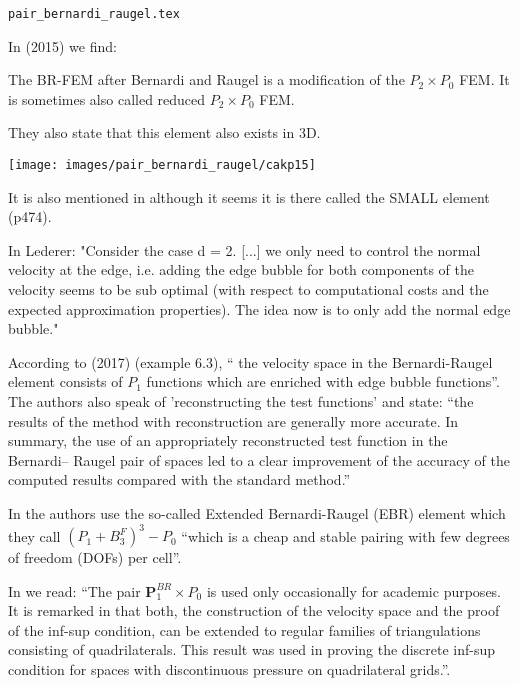 \begin{flushright} {\tiny {\color{gray} \tt pair\_bernardi\_raugel.tex}} \end{flushright}

In \textcite{cakp15} (2015) we find: 
\begin{displayquote}
{\color{darkgray}
The BR-FEM after Bernardi and Raugel \cite{bera85} 
is a modification of the $P_2\times P_0$ FEM. 
It is sometimes also called reduced $P_2\times P_0$ FEM.}
\end{displayquote}
They also state that this element also exists in 3D.

\begin{center}
\texttt{[image: images/pair\_bernardi\_raugel/cakp15]}
\end{center}

It is also mentioned in \textcite{bobf13} although it seems it is there called the SMALL element (p474).

In Lederer: "Consider the case d = 2. [...] we only need to control 
the normal velocity at the edge, i.e. adding the
edge bubble for both components of the velocity seems to be sub optimal (with respect to
computational costs and the expected approximation properties). The idea now is to only
add the normal edge bubble."

According to \textcite{jolm17} (2017) (example 6.3), `` the velocity space in the Bernardi-Raugel
element consists of $P_1$ functions which are enriched with edge bubble functions''.
The authors also speak of 'reconstructing the test functions' and state: 
``the results of the method with reconstruction are generally more accurate.
In summary, the use of an appropriately reconstructed test function in the Bernardi–
Raugel pair of spaces led to a clear improvement of the accuracy of the computed
results compared with the standard method.''

In \cite{befh21} the authors use the so-called Extended Bernardi-Raugel (EBR) element
which they call $(P_1 + B_3^F)^3 - P_0$ ``which is a cheap and stable pairing with few degrees of
freedom (DOFs) per cell''.

In \textcite{john16} we read: {\color{darkgray} ``The pair 
${\bm P}_1^{BR} \times P_0$ is used only occasionally for academic purposes.
It is remarked in \textcite{bera85} that both, the construction of the velocity
space and the proof of the inf-sup condition, can be extended to regular families
of triangulations consisting of quadrilaterals. This result was used in proving the
discrete inf-sup condition for spaces with discontinuous pressure on quadrilateral
grids.''}.

